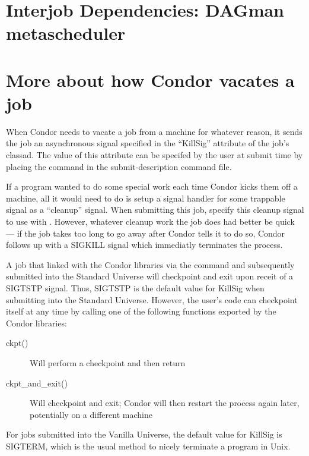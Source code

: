 \section{Interjob Dependencies: DAGman metascheduler}
\Todo

\section{More about how Condor vacates a job}

When Condor needs to vacate a job from a machine for whatever reason, it
sends the job an asynchronous signal specified in the ``KillSig''
attribute of the job's classad.  The value of this attribute can be specifed by
the user at submit time by placing the  command in the
 submit-description command file.  

If a program wanted to do some special work each time
Condor kicks them off a machine, all it would need to do is setup a
signal handler for some trappable signal as a ``cleanup'' signal.  When
submitting this job, specify this cleanup signal to use with
.  However, whatever cleanup work the job does had better be quick
--- if the job takes too long to go away after Condor tells it to do so, Condor
follows up with a SIGKILL signal which immediatly terminates the
process.

A job that linked with the Condor libraries via the 
command and subsequently submitted into the Standard Universe 
will checkpoint and exit upon receit of a SIGTSTP signal.  Thus, SIGTSTP is
the default value for KillSig when submitting into the Standard
Universe.  However, the user's code can checkpoint itself at any time
by calling one of the following functions exported by the Condor libraries:
\begin{description}
\item[ckpt()] Will perform a checkpoint and then return
\item[ckpt\_and\_exit()] Will checkpoint and exit; Condor will then
restart the process again later, potentially on a different machine
\end{description}

For jobs submitted into the Vanilla Universe, the default value for
KillSig is SIGTERM, which is the usual method to nicely terminate a
program in Unix.

